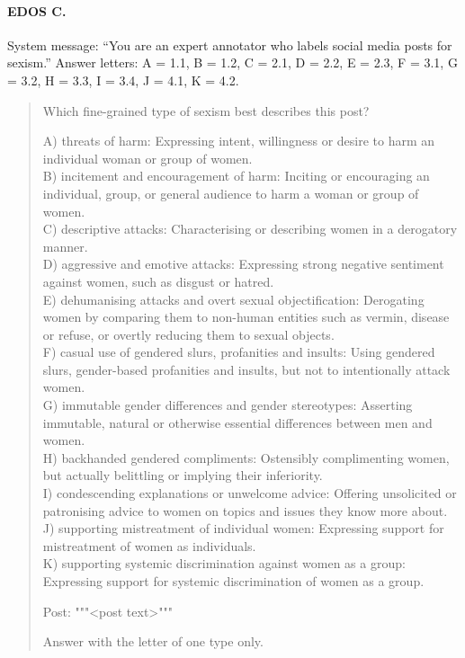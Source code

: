 \paragraph{EDOS C.} System message: ``You are an expert annotator who labels social media posts for sexism.'' Answer letters: A = 1.1, B = 1.2, C = 2.1, D = 2.2, E = 2.3, F = 3.1, G = 3.2, H = 3.3, I = 3.4, J = 4.1, K = 4.2.
\begin{quote}\footnotesize\ttfamily\raggedright Which fine-grained type of sexism best describes this post?

A) threats of harm: Expressing intent, willingness or desire to harm an individual woman or group of women.\\
B) incitement and encouragement of harm: Inciting or encouraging an individual, group, or general audience to harm a woman or group of women.\\
C) descriptive attacks: Characterising or describing women in a derogatory manner.\\
D) aggressive and emotive attacks: Expressing strong negative sentiment against women, such as disgust or hatred.\\
E) dehumanising attacks and overt sexual objectification: Derogating women by comparing them to non-human entities such as vermin, disease or refuse, or overtly reducing them to sexual objects.\\
F) casual use of gendered slurs, profanities and insults: Using gendered slurs, gender-based profanities and insults, but not to intentionally attack women.\\
G) immutable gender differences and gender stereotypes: Asserting immutable, natural or otherwise essential differences between men and women.\\
H) backhanded gendered compliments: Ostensibly complimenting women, but actually belittling or implying their inferiority.\\
I) condescending explanations or unwelcome advice: Offering unsolicited or patronising advice to women on topics and issues they know more about.\\
J) supporting mistreatment of individual women: Expressing support for mistreatment of women as individuals.\\
K) supporting systemic discrimination against women as a group: Expressing support for systemic discrimination of women as a group.

Post: """<post text>"""

Answer with the letter of one type only.\end{quote}


